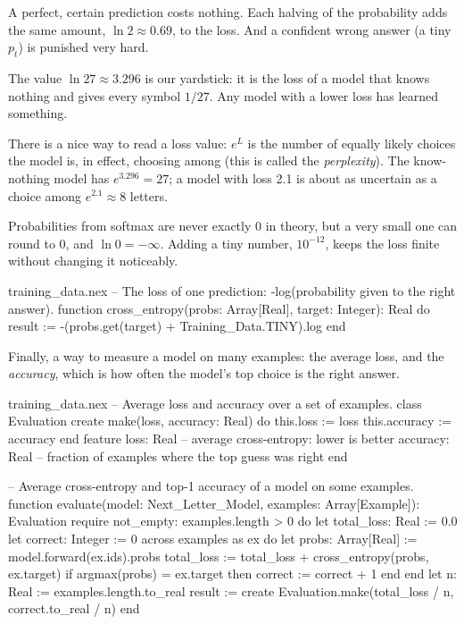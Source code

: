 \documentclass[11pt,a4paper,oneside,openany]{book}
\begin{document}
A perfect, certain prediction costs nothing. Each halving of the
probability adds the same amount, $\ln 2\approx 0.69$, to the loss. And a
confident wrong answer (a tiny $p_t$) is punished very hard.

The value $\ln 27\approx 3.296$ is our yardstick: it is the loss of a
model that knows nothing and gives every symbol $1/27$. Any model with a
lower loss has learned something.

There is a nice way to read a loss value: $e^{L}$ is the number of
equally likely choices the model is, in effect, choosing among (this is
called the \emph{perplexity}). The know-nothing model has $e^{3.296} =
27$; a model with loss 2.1 is about as uncertain as a choice among
$e^{2.1}\approx 8$ letters.

Probabilities from softmax are never exactly 0 in theory, but a very small
one can round to 0, and $\ln 0 = -\infty$. Adding a tiny number,
$10^{-12}$, keeps the loss finite without changing it noticeably.

\begin{append}{training_data.nex}
-- The loss of one prediction: -log(probability given to the right answer).
function cross_entropy(probs: Array[Real], target: Integer): Real do
  result := -(probs.get(target) + Training_Data.TINY).log
end
\end{append}

Finally, a way to measure a model on many examples: the average loss,
and the \emph{accuracy}, which is how often the model's top choice is the
right answer.

\begin{append}{training_data.nex}
-- Average loss and accuracy over a set of examples.
class Evaluation
create
  make(loss, accuracy: Real) do
    this.loss := loss
    this.accuracy := accuracy
  end
feature
  loss: Real       -- average cross-entropy: lower is better
  accuracy: Real   -- fraction of examples where the top guess was right
end

-- Average cross-entropy and top-1 accuracy of a model on some examples.
function evaluate(model: Next_Letter_Model, examples: Array[Example]): Evaluation
require
  not_empty: examples.length > 0
do
  let total_loss: Real := 0.0
  let correct: Integer := 0
  across examples as ex do
    let probs: Array[Real] := model.forward(ex.ids).probs
    total_loss := total_loss + cross_entropy(probs, ex.target)
    if argmax(probs) = ex.target then
      correct := correct + 1
    end
  end
  let n: Real := examples.length.to_real
  result := create Evaluation.make(total_loss / n, correct.to_real / n)
end
\end{append}
\end{document}
